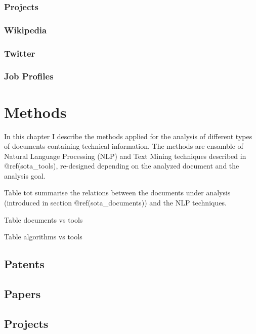 \documentclass[]{book}
\begin{document}
\subsection{Projects}\label{sotadocumentsprojects}

\subsection{Wikipedia}\label{sotadocumentswiki}

\subsection{Twitter}\label{sotadocumentstwitter}

\subsection{Job Profiles}\label{sotadocumentsjobs}

\chapter{Methods}\label{methods}

In this chapter I describe the methods applied for the analysis of
different types of documents containing technical information. The
methods are ensamble of Natural Language Processing (NLP) and Text
Mining techniques described in @ref(sota\_tools), re-designed depending
on the analyzed document and the analysis goal.

Table tot summarise the relations between the documents under analysis
(introduced in section @ref(sota\_documents)) and the NLP techniques.

Table documents vs tools

Table algorithms vs tools

\section{Patents}\label{patents}

\section{Papers}\label{papers}

\section{Projects}\label{projects}
\end{document}

